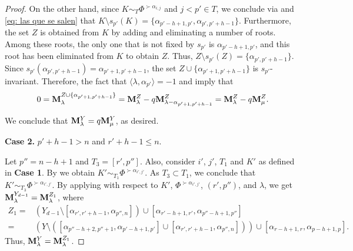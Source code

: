 \begin{proof}
On the other hand, since $ K \sim_T \Phi^{\succ \alpha_{i, j}} $ and $ j < p' \in T $, we conclude via  and \eqref{eq: las que se salen} that $ K \setminus s_{p'}(K) = \{ \alpha_{p'-h+1, p'}, \alpha_{p', p'+h-1} \} $. Furthermore, the set $ Z $ is obtained from $ K $ by adding and eliminating a number of roots. Among these roots, the only one that is not fixed by $ s_{p'} $ is $ \alpha_{p'-h+1, p'} $, and this root has been eliminated from $ K $ to obtain $ Z $. Thus, $ Z \setminus s_{p'}(Z) = \{ \alpha_{p', p'+h-1} \} $. Since $ s_{p'}(\alpha_{p', p'+h-1}) = \alpha_{p'+1, p'+h-1} $, the set $ Z \cup \{ \alpha_{p'+1, p'+h-1} \} $ is $ s_{p'} $-invariant. Therefore, the fact that  $\langle \lambda ,\alpha_{p'} \rangle = -1 $ and   imply that
\begin{equation}
    0 = \mathbf{M}_{\lambda}^{Z \cup \{ \alpha_{p'+1, p'+h-1} \}} = \mathbf{M}_{\lambda}^{Z} - q \mathbf{M}_{\lambda - \alpha_{p'+1, p'+h-1}}^{Z}  = \mathbf{M}_{\lambda}^{Z} - q \mathbf{M}_{\mu}^{Z}.
\end{equation}

We conclude that $ \mathbf{M}_\lambda^Y = q \mathbf{M}_\mu^Y $, as desired.





\bigskip
\noindent \textbf{Case 2. }  $p'+h-1 > n$ and $r'+h-1 \leq n$. 

 Let $p''= n-h+1$ and $T_{3} = [r',p'']$. Also, consider  $i'$, $j'$,  $T_{1}$ and $K'$ as defined in \textbf{Case 1}. By  we obtain  $K'  \sim_{T_{1}} \Phi^{\succ \alpha_{i',j'}}$. As $T_{3} \subset T_{1}$, we conclude that $K' \sim_{T_{3}} \Phi^{\succ \alpha_{i',j'}}$.  By applying  with respect to $K'$, $\Phi^{\succ \alpha_{i',j'}}$, $(r', p'')$, and $\lambda$, we get $\mathbf{M}_{\lambda}^{Y_{d-1}} = \mathbf{M}_{\lambda}^{Z_1}$, where 
\begin{equation}
\begin{array}{rl}
    Z_1 =& \left(Y_{d-1} \setminus [\alpha_{r',r'+h-1}, \alpha_{p'',n}] \right) \cup [\alpha_{r'-h+1,r'}, \alpha_{p''-h+1,p''}] \\
     =& \left(Y \setminus \left([\alpha_{p''-h+2,p''+1}, \alpha_{p'-h+1,p'}] \cup [\alpha_{r',r'+h-1}, \alpha_{p'',n}] \right) \right) \cup [\alpha_{r-h+1,r}, \alpha_{p-h+1,p}].
\end{array}
\end{equation}
Thus,  $\mathbf{M}_{\lambda}^{Y} = \mathbf{M}_{\lambda}^{Z_1}$.


\end{proof}
